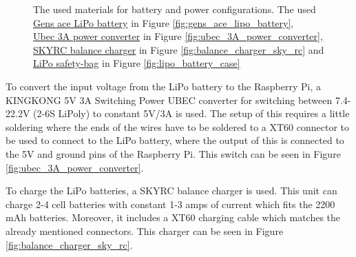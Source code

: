 \documentclass[../Head/report.tex]{subfiles}
\begin{document}
\begin{figure}[H]
    \caption{The used materials for battery and power configurations. The used \href{https://www.conradelektronik.dk/p/gens-ace-modelbyggeri-batteripakke-lipo-111-v-2200-mah-celletal-3-45-c-xt60-2145181?gclid=CjwKCAjwmv-DBhAMEiwA7xYrdyX00RZAovYbKhjWqit3MYObx_NtIH_NOxPih2MBqFoyuJrHtL_R7xoCg28QAvD_BwE&gclsrc=aw.ds&utm_campaign=shopping-feed&utm_content=free-google-shopping-clicks&utm_medium=surfaces&utm_source=google&utm_term=2145181&vat=true}{Gens ace LiPo battery} in Figure \ref{fig:gens_ace_lipo_battery}, \\ \href{https://hobbyking.com/en_us/kingkong-5v-3a-ubec.html?___store=en_us}{Ubec 3A power converter} in Figure \ref{fig:ubec_3A_power_converter}, \href{https://www.banggood.com/da/SKYRC-E430-Balance-Charger-AC-100-240V-Cells-Lipo-LiFe-30W-1A-2A-3A-p-1124821.html?utm_source=googleshopping&utm_medium=cpc_organic&gmcCountry=DK&utm_content=minha&utm_campaign=minha-dk-da-pc&currency=DKK&cur_warehouse=CN&createTmp=1&utm_source=googleshopping&utm_medium=cpc_union&utm_content=sandra&utm_campaign=sandra-ssc-dk-da-all-0302&ad_id=337427030565&gclid=CjwKCAjwmv-DBhAMEiwA7xYrdwCnJMgzOnZp9FJBPNSDSS_RO2Q67TIQ2FderUjGhzySiWRObpBN6xoCtE4QAvD_BwE}{SKYRC balance charger} in Figure \ref{fig:balance_charger_sky_rc} and \href{https://cdon.dk/hjem-have/extron-modellbau-lipo-safety-bag-1-set-p47436624?fo_c=1923&fo_k=47efd6de4697e54ef539b8256db201cb&fo_s=gpladk&utm_medium=cpo&utm_source=tradedoubler&utm_campaign=affiliate&utm_content=tradedoubler_3153538_General_VelkashoppingcomDK}{LiPo safety-bag} in Figure \ref{fig:lipo_battery_case}}
    \label{fig:battery_and_power_connections}
\end{figure}

To convert the input voltage from the LiPo battery to the Raspberry Pi, a KINGKONG 5V 3A Switching Power UBEC converter for switching between 7.4-22.2V (2-6S LiPoly) to constant 5V/3A is used. The setup of this requires a little soldering where the ends of the wires have to be soldered to a XT60 connector to be used to connect to the LiPo battery, where the output of this is connected to the 5V and ground pins of the Raspberry Pi. This switch can be seen in Figure \ref{fig:ubec_3A_power_converter}. 

To charge the LiPo batteries, a SKYRC balance charger is used. This unit can charge 2-4 cell batteries with constant 1-3 amps of current which fits the 2200 mAh batteries. Moreover, it includes a XT60 charging cable which matches the already mentioned connectors. This charger can be seen in Figure \ref{fig:balance_charger_sky_rc}.
\end{document}
